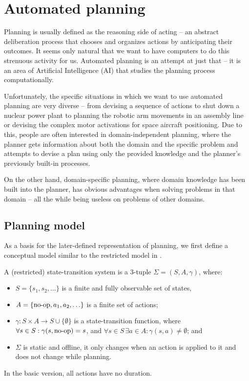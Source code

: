 
\section{Automated planning}

Planning is usually defined as the reasoning side of acting -- an abstract deliberation
process that chooses and organizes actions by anticipating their outcomes. \citep[Section~1.1]{Ghallab2004}
It seems only natural that we want to have computers to do this strenuous activity for us.
Automated planning is an attempt at just that -- it is an area of Artificial Intelligence (AI) that
studies the planning process computationally. \citep[Section~1.1]{Ghallab2004}

Unfortunately, the specific situations in which we want to use automated planning are very diverse --
from devising a sequence of actions to shut down a nuclear power plant to planning the robotic arm
movements in an assembly line or devising the complex motor activations for space aircraft positioning.
Due to this, people are often interested in domain-independent planning, where the planner gets information
about both the domain and the specific problem and attempts to devise a plan using only the provided knowledge
and the planner's previously built-in processes. \citep[Section~1.3]{Ghallab2004}

On the other hand, domain-specific planning, where domain knowledge has been built into the planner,
has obvious advantages when solving problems in that domain -- all the while being useless on problems of other
domains. \citep[Section~1.3]{Ghallab2004}

\subsection{Planning model}

As a basis for the later-defined representation of planning, we first define
a conceptual model similar to the restricted model in \citep[Section~1.4, Section~1.5]{Ghallab2004}.

\begin{defn}\label{defn:state-transition-sys}
A (restricted) state-transition system is a 3-tuple $\Sigma = (S, A, \gamma)$, where:
\begin{itemize}
\item $S = \{s_1, s_2, \ldots\}$ is a finite and fully observable set of states,
\item $A = \{\operatorname{\textrm{no-op}}, a_1, a_2, \ldots\}$ is a finite set of actions;
\item $\gamma: S \times A \to S \cup \{\emptyset\}$ is a state-transition function,
where $\forall s \in S : \gamma(s, \operatorname{\textrm{no-op}}) = s$,
and $\forall s \in S\,\exists a \in A : \gamma(s, a) \neq \emptyset$; and
\item $\Sigma$ is static and offline,
it only changes when an action is applied to it and does not change while planning.
\end{itemize}
In the basic version, all actions have no duration.
\end{defn}

